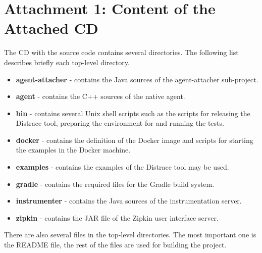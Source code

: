 \chapter*{Attachment 1: Content of the Attached CD}
The CD with the source code contains several directories. The following list describes briefly each top-level directory.
\begin{itemize}
	\item \textbf{agent-attacher} - contains the Java sources of the agent-attacher sub-project.
	\item \textbf{agent} - contains the C++ sources of the native agent.
	\item \textbf{bin} - contains several Unix shell scripts such as the scripts for releasing the Distrace tool, preparing the environment for and running the tests.
	\item \textbf{docker} - contains the definition of the Docker image and scripts for starting the examples in the Docker machine.
	\item \textbf{examples} - contains the examples of the Distrace tool may be used.
	\item \textbf{gradle} - contains the required files for the Gradle build system.
	\item \textbf{instrumenter} - contains the Java sources of the instrumentation server.
	\item \textbf{zipkin} - contains the JAR file of the Zipkin user interface server.
\end{itemize}
 There are also several files in the top-level directories. The most important one is the README file, the rest of the files are used for building the project.